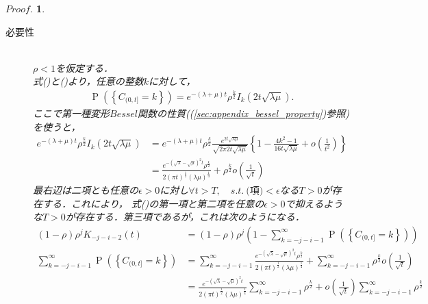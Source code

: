 \documentclass[a4j,papersize,disablejfam,slide,14pt]{jsarticle}
\newtheorem{Proof}{$Proof.$}
\def\exp#1{e^{#1}} %
\def\prob#1{\operatorname{P} \left(\left\{ #1 \right\}\right)} %
\begin{document}
    \begin{Proof}
    	\begin{description}
        	\item[必要性]\mbox{}\\
            	$\rho < 1$を仮定する．\\
            	式()と()より，任意の整数$k$に対して，
                \begin{align}
                	\prob{C_{(0, t]}=k} = \exp{-(\lambda+\mu)t}\rho^{\frac{k}{2}} I_k(2t\sqrt{\lambda\mu}).
                \end{align}
                ここで第一種変形$Bessel$関数の性質((\ref{sec:appendix_bessel_property})参照)を使うと，
                \begin{align}
                	\exp{-(\lambda+\mu)t}\rho^{\frac{k}{2}} I_k(2t\sqrt{\lambda\mu}) 
                    &= \exp{-(\lambda+\mu)t}\rho^{\frac{k}{2}} \frac{ \exp{2t\sqrt{\lambda \mu}} }{ \sqrt{2 \pi 2t\sqrt{\lambda \mu}} }
                    	\left\{ 1-\frac{4k^2 - 1}{16t\sqrt{\lambda \mu}} + o\left( \frac{1}{t^2} \right) \right\} \\
                    &= \frac{ \exp{-(\sqrt{\lambda}-\sqrt{\mu})^2 t} \rho^\frac{k}{2} }{ 2(\pi t)^\frac{1}{2} (\lambda \mu)^\frac{1}{4} } + \rho^{\frac{k}{2}} o\left( \frac{1}{\sqrt{t}} \right) \label{eq:prob_c_deform}
                \end{align}
                最右辺は二項とも任意の$\epsilon > 0$に対し$\forall t > T,\quad s.t.\ \mbox{(項)} < \epsilon$なる$T > 0$が存在する．これにより，
                式()の第一項と第二項を任意の$\epsilon > 0$で抑えるような$T > 0$が存在する．第三項であるが，これは次のようになる．
                \begin{align}
                	(1-\rho)\rho^j K_{-j-i-2}(t) &= (1-\rho)\rho^j \left(1 - \sum_{k=-j-i-1}^{\infty} \prob{C_{(0, t]}=k} \right) \\
                    \sum_{k=-j-i-1}^{\infty} \prob{C_{(0, t]}=k} 
                    &= \sum_{k=-j-i-1}^{\infty} \frac{ \exp{-(\sqrt{\lambda}-\sqrt{\mu})^2 t} \rho^\frac{k}{2} }{ 2(\pi t)^\frac{1}{2} (\lambda \mu)^\frac{1}{4} } 
                    	+ \sum_{k=-j-i-1}^{\infty} \rho^{\frac{k}{2}} o\left( \frac{1}{\sqrt{t}} \right) \\
                    &= \frac{ \exp{-(\sqrt{\lambda}-\sqrt{\mu})^2 t} }{ 2(\pi t)^\frac{1}{2} (\lambda \mu)^\frac{1}{4} } \sum_{k=-j-i-1}^{\infty}  \rho^\frac{k}{2} 
                    	+ o\left( \frac{1}{\sqrt{t}} \right) \sum_{k=-j-i-1}^{\infty} \rho^{\frac{k}{2}} \\

\end{align}
\end{description}
\end{Proof}
\end{document}
